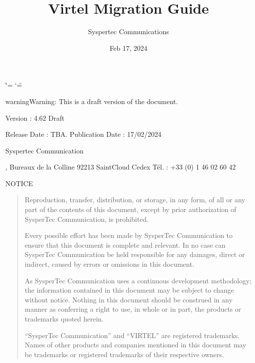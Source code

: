\documentclass[letterpaper,10pt,english]{sphinxmanual}
\title{Virtel Migration Guide}
\date{Feb 17, 2024}
\author{Syspertec Communications}
\begin{document}
\ifdefined\shorthandoff
  \ifnum\catcode`\=\string=\active\shorthandoff{=}\fi
  \ifnum\catcode`\"=\active{}\fi
\fi

\pagestyle{empty}
\sphinxmaketitle
\pagestyle{plain}
\sphinxtableofcontents
\pagestyle{normal}
\label{\detokenize{Migration_Guide::doc}}


\sphinxAtStartPar
{}

\begin{sphinxadmonition}{warning}{Warning:}
\sphinxAtStartPar
This is a draft version of the document.
\end{sphinxadmonition}

\sphinxAtStartPar
Version : 4.62 Draft

\sphinxAtStartPar
Release Date : TBA. Publication Date : 17/02/2024

\sphinxAtStartPar
Syspertec Communication

, Bureaux de la Colline 92213 Saint\sphinxhyphen{}Cloud Cedex Tél. : +33 (0) 1 46 02 60 42

\sphinxAtStartPar
{}

\sphinxAtStartPar
NOTICE
\begin{quote}

\sphinxAtStartPar
Reproduction, transfer, distribution, or storage, in any form, of all or any part of
the contents of this document, except by prior authorization of SysperTec
Communication, is prohibited.

\sphinxAtStartPar
Every possible effort has been made by SysperTec Communication to ensure that this document
is complete and relevant. In no case can SysperTec Communication be held responsible for
any damages, direct or indirect, caused by errors or omissions in this document.

\sphinxAtStartPar
As SysperTec Communication uses a continuous development methodology; the information
contained in this document may be subject to change without notice. Nothing in this
document should be construed in any manner as conferring a right to use, in whole or in
part, the products or trademarks quoted herein.

\sphinxAtStartPar
“SysperTec Communication” and “VIRTEL” are registered trademarks. Names of other products
and companies mentioned in this document may be trademarks or registered trademarks of
their respective owners.
\end{quote}
\end{document}

